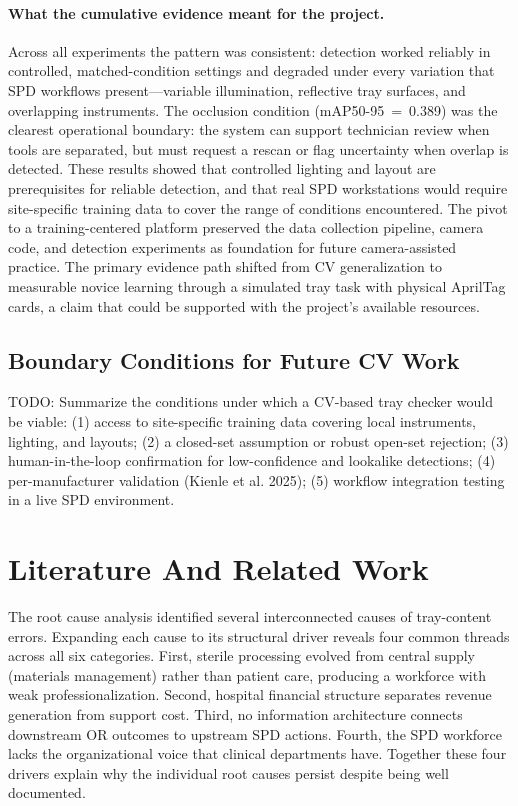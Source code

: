 \documentclass[10pt,a4paper]{article}
\begin{document}
\paragraph{What the cumulative evidence meant for the project.}
Across all experiments the pattern was consistent: detection worked
reliably in controlled, matched-condition settings and degraded under
every variation that SPD workflows present---variable illumination,
reflective tray surfaces, and overlapping instruments. The occlusion
condition (mAP50-95~=~0.389) was the clearest operational boundary:
the system can support technician review when tools are separated, but
must request a rescan or flag uncertainty when overlap is detected.
These results showed that controlled lighting and layout are
prerequisites for reliable detection, and that real SPD workstations
would require site-specific training data to cover the range of
conditions encountered. The pivot to a training-centered platform
preserved the data collection pipeline, camera code, and detection
experiments as foundation for future camera-assisted practice. The
primary evidence path shifted from CV generalization to measurable
novice learning through a simulated tray task with physical AprilTag
cards, a claim that could be supported with the project's available
resources.
\subsection{Boundary Conditions for Future CV Work}
\label{sec:boundary-conditions-for-future-cv-work}


TODO: Summarize the conditions under which a CV-based tray checker would be viable: (1) access to site-specific training data covering local instruments, lighting, and layouts; (2) a closed-set assumption or robust open-set rejection; (3) human-in-the-loop confirmation for low-confidence and lookalike detections; (4) per-manufacturer validation (Kienle et al. 2025); (5) workflow integration testing in a live SPD environment.







\section{Literature And Related Work}
\label{sec:literature-and-related-work}
The root cause analysis identified several interconnected causes of tray-content errors. Expanding each cause to its structural driver reveals four common threads across all six categories. First, sterile processing evolved from central supply (materials management) rather than patient care, producing a workforce with weak professionalization. Second, hospital financial structure separates revenue generation from support cost. Third, no information architecture connects downstream OR outcomes to upstream SPD actions. Fourth, the SPD workforce lacks the organizational voice that clinical departments have. Together these four drivers explain why the individual root causes persist despite being well documented.
\end{document}
